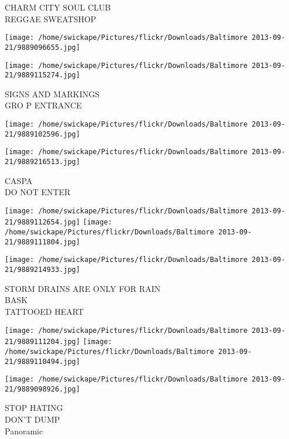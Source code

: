\documentclass[10pt,letterpaper]{article}
\begin{document}
CHARM CITY SOUL CLUB\\
REGGAE SWEATSHOP\\
\pagebreak

\texttt{[image: /home/swickape/Pictures/flickr/Downloads/Baltimore 2013-09-21/9889096655.jpg]}

\vspace{0.25in}
\texttt{[image: /home/swickape/Pictures/flickr/Downloads/Baltimore 2013-09-21/9889115274.jpg]}

SIGNS AND MARKINGS\\
GRO P ENTRANCE\\
\pagebreak

\texttt{[image: /home/swickape/Pictures/flickr/Downloads/Baltimore 2013-09-21/9889102596.jpg]}

\vspace{0.25in}
\texttt{[image: /home/swickape/Pictures/flickr/Downloads/Baltimore 2013-09-21/9889216513.jpg]}

CASPA\\
DO NOT ENTER\\
\pagebreak

\texttt{[image: /home/swickape/Pictures/flickr/Downloads/Baltimore 2013-09-21/9889112654.jpg]}
\texttt{[image: /home/swickape/Pictures/flickr/Downloads/Baltimore 2013-09-21/9889111804.jpg]}

\vspace{0.25in}
\texttt{[image: /home/swickape/Pictures/flickr/Downloads/Baltimore 2013-09-21/9889214933.jpg]}

STORM DRAINS ARE ONLY FOR RAIN\\
BASK\\
TATTOOED HEART\\
\pagebreak

\texttt{[image: /home/swickape/Pictures/flickr/Downloads/Baltimore 2013-09-21/9889111204.jpg]}
\texttt{[image: /home/swickape/Pictures/flickr/Downloads/Baltimore 2013-09-21/9889110494.jpg]}

\vspace{0.25in}
\texttt{[image: /home/swickape/Pictures/flickr/Downloads/Baltimore 2013-09-21/9889098926.jpg]}

STOP HATING\\
DON'T DUMP\\
Panoramic\\
\pagebreak
\end{document}
